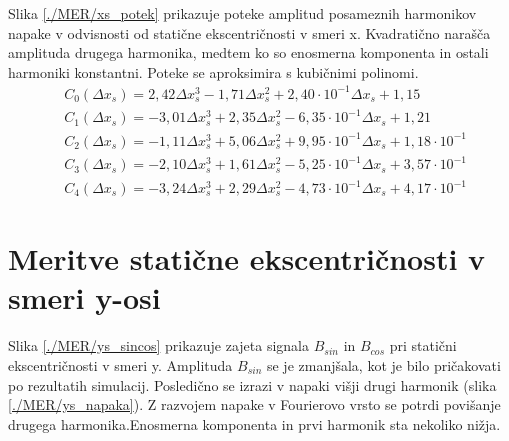 Slika \ref{./MER/xs_potek} prikazuje poteke amplitud posameznih harmonikov napake v odvisnosti od statične ekscentričnosti v smeri x. Kvadratično narašča amplituda drugega harmonika, medtem ko so enosmerna komponenta in ostali harmoniki konstantni. Poteke se aproksimira s kubičnimi polinomi.
\begin{eqnarray}
&C_0(\Delta x_s) =2,42\Delta x_s^{3}-1,71\Delta x_s^{2}+2,40\cdot 10^{-1}\Delta x_s+1,15 \\              
&C_1(\Delta x_s) =-3,01\Delta x_s^{3}+2,35\Delta x_s^{2}-6,35\cdot 10^{-1}\Delta x_s+1,21 \\             
&C_2(\Delta x_s) =-1,11\Delta x_s^{3}+5,06\Delta x_s^{2}+9,95\cdot 10^{-1}\Delta x_s+1,18\cdot 10^{-1} \\
&C_3(\Delta x_s) =-2,10\Delta x_s^{3}+1,61\Delta x_s^{2}-5,25\cdot 10^{-1}\Delta x_s+3,57\cdot 10^{-1} \\
&C_4(\Delta x_s) =-3,24\Delta x_s^{3}+2,29\Delta x_s^{2}-4,73\cdot 10^{-1}\Delta x_s+4,17\cdot 10^{-1}
\end{eqnarray}
\section{Meritve statične ekscentričnosti v smeri y-osi}
Slika \ref{./MER/ys_sincos} prikazuje zajeta signala $B_{sin}$ in $B_{cos}$ pri statični ekscentričnosti v smeri y. Amplituda $B_{sin}$ se je zmanjšala, kot je bilo pričakovati po rezultatih simulacij. Posledično se izrazi v napaki višji drugi harmonik (slika \ref{./MER/ys_napaka}). Z razvojem napake v Fourierovo vrsto se potrdi povišanje drugega harmonika.Enosmerna komponenta in prvi harmonik sta nekoliko nižja.
\newpage
